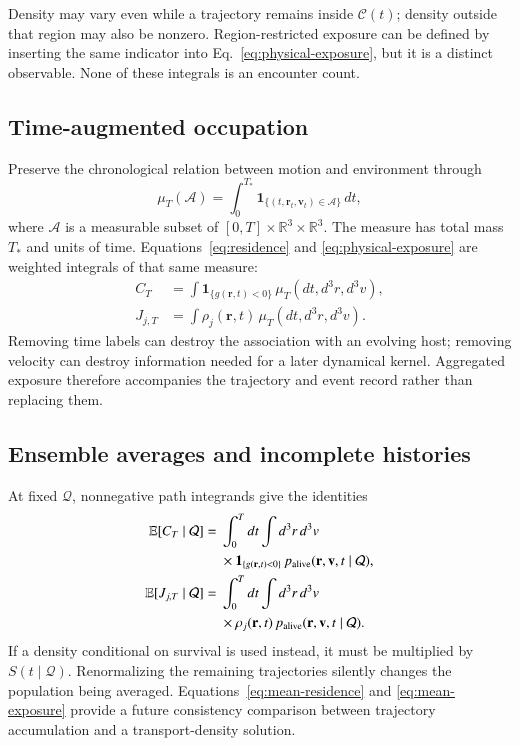 \documentclass[aps,prd,reprint,amsmath,amssymb,superscriptaddress,nofootinbib,longbibliography,floatfix]{revtex4-2}
\begin{document}
Density may vary even while a trajectory remains inside $\mathcal C(t)$; density outside that region may also be nonzero. Region-restricted exposure can be defined by inserting the same indicator into Eq.~\eqref{eq:physical-exposure}, but it is a distinct observable. None of these integrals is an encounter count.

\subsection{Time-augmented occupation}

Preserve the chronological relation between motion and environment through
\begin{equation}
\mu_T(\mathcal A)=\int_0^{T_*}
\mathbf{1}_{\{(t,\mathbf r_t,\mathbf v_t)\in\mathcal A\}}\,dt,
\label{eq:occupation}
\end{equation}
where $\mathcal A$ is a measurable subset of
$[0,T]\times\mathbb R^3\times\mathbb R^3$.
The measure has total mass $T_*$ and units of time. Equations~\eqref{eq:residence} and \eqref{eq:physical-exposure} are weighted integrals of that same measure:
\begin{align}
C_T&=\int\mathbf{1}_{\{g(\mathbf r,t)<0\}}\,
\mu_T(dt,d^3r,d^3v),
\label{eq:occupation-residence}\\
J_{j,T}&=\int\rho_j(\mathbf r,t)\,
\mu_T(dt,d^3r,d^3v).
\label{eq:occupation-exposure}
\end{align}
Removing time labels can destroy the association with an evolving host; removing velocity can destroy information needed for a later dynamical kernel. Aggregated exposure therefore accompanies the trajectory and event record rather than replacing them.

\subsection{Ensemble averages and incomplete histories}

At fixed $\mathcal Q$, nonnegative path integrands give the identities
\begin{align}
\mathbb E[C_T\mid\mathcal Q]
={}&\int_0^Tdt\int d^3r\,d^3v\,\nonumber\\
&\times\mathbf{1}_{\{g(\mathbf r,t)<0\}}\,
p_{\rm alive}(\mathbf r,\mathbf v,t\mid\mathcal Q),
\label{eq:mean-residence}\\
\mathbb E[J_{j,T}\mid\mathcal Q]
={}&\int_0^Tdt\int d^3r\,d^3v\,\nonumber\\
&\times\rho_j(\mathbf r,t)\,
p_{\rm alive}(\mathbf r,\mathbf v,t\mid\mathcal Q).
\label{eq:mean-exposure}
\end{align}
If a density conditional on survival is used instead, it must be multiplied by $S(t\mid\mathcal Q)$. Renormalizing the remaining trajectories silently changes the population being averaged. Equations~\eqref{eq:mean-residence} and \eqref{eq:mean-exposure} provide a future consistency comparison between trajectory accumulation and a transport-density solution.
\end{document}
